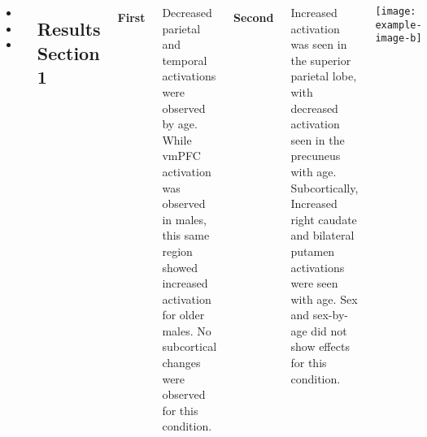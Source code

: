 \documentclass[
25pt,
a0paper, 
portrait,
blockverticalspace=.1em,
margin=.5in,
innermargin=0mm
]{tikzposter}
\begin{document}
	{
	
	\begin{columns}
		\begin{minipage}[t]{0.3\linewidth}

			\begin{itemize}
				\item 
				\item 
				\item 
			\end{itemize}
			
			\vspace{1em}
			
			
			\subsection*{Results Section 1}
			
			\paragraph{First} Decreased parietal and temporal activations were observed by age. While vmPFC activation was observed in males, this same region showed increased activation for older males. No subcortical changes were observed for this condition.
			
			\paragraph{Second} Increased activation was seen in the superior parietal lobe, with decreased activation seen in the precuneus with age. Subcortically, Increased right caudate and bilateral putamen activations were seen with age. Sex and sex-by-age did not show effects for this condition.
			
			
		\end{minipage}
		\begin{minipage}[t]{0.7\linewidth}
			\begin{tikzfigure}[Caption]
				\texttt{[image: example-image-b]}
			\end{tikzfigure}
		\end{minipage}
		

\end{columns}}
\end{document}
